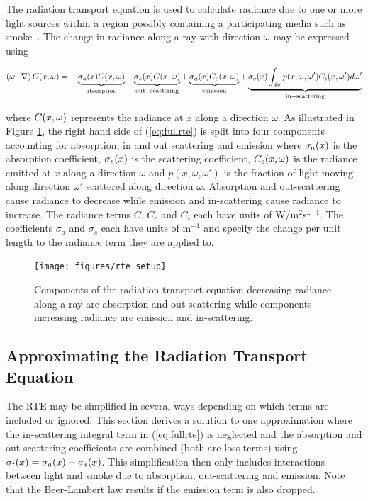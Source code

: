 The radiation transport equation is used to calculate radiance due to one or more light sources within a region possibly containing a participating media such as smoke~\cite{Siegel:2001}. The change in radiance along a ray with direction $\omega$ may be expressed using

\begin{eqnarray}
\label{eq:fullrte}
 \left(\omega\cdot\nabla\right)C(x,\omega) =
-\underbrace{\sigma_a(x)C(x,\omega)}_\mathrm{absorption}-\underbrace{\sigma_s(x)C(x,\omega)}_\mathrm{out-scattering}
+ \underbrace{\sigma_a(x)C_e(x,\omega)}_\mathrm{emission} +
\underbrace{\sigma_s(x)\int_{4\pi}p(x,\omega,\omega')C_i(x,\omega')d\omega'}_\mathrm{in-scattering}
\end{eqnarray}

\noindent where  $C(x,\omega)$ represents the  radiance at $x$ along a direction $\omega$.
As illustrated in Figure \ref{figRadiance}, the right hand side of (\ref{eq:fullrte}) is split into four components accounting for absorption, in and out scattering and emission where $\sigma_a(x)$ is the absorption coefficient, $\sigma_s(x)$ is the scattering coefficient, $C_e(x,\omega)$ is the radiance emitted at $x$ along a direction $\omega$ and $p(x,\omega,\omega')$ is the fraction of light moving along direction $\omega'$ scattered along direction $\omega$. Absorption and out-scattering cause radiance to decrease while emission and in-scattering cause radiance to increase. The radiance terms $C$, $C_e$ and $C_i$ each have units of W/m$^2$sr$^{-1}$.  The coefficients $\sigma_a$ and $\sigma_s$ each have units of m$^{-1}$ and specify the change per unit length to the radiance term they are applied to.

\begin{figure}[\figoptions]
\begin{center}
\texttt{[image: figures/rte\_setup]}
\end{center}
\caption{Components of the radiation transport equation decreasing radiance along a ray are
absorption and out-scattering while components increasing radiance are emission and in-scattering.}
\label{figRadiance}
\end{figure}


\subsection{Approximating the Radiation Transport Equation}

The RTE may be simplified in several ways depending on which terms are included or ignored.  This section derives a solution to one approximation where the in-scattering integral term in (\ref{eq:fullrte}) is neglected and the absorption and out-scattering coefficients are combined (both are loss terms) using $\sigma_t(x)=\sigma_a(x)+\sigma_s(x)$.  This simplification then only includes interactions between light and smoke due to absorption,  out-scattering and emission.  Note that the Beer-Lambert law results if the emission term is also dropped.

